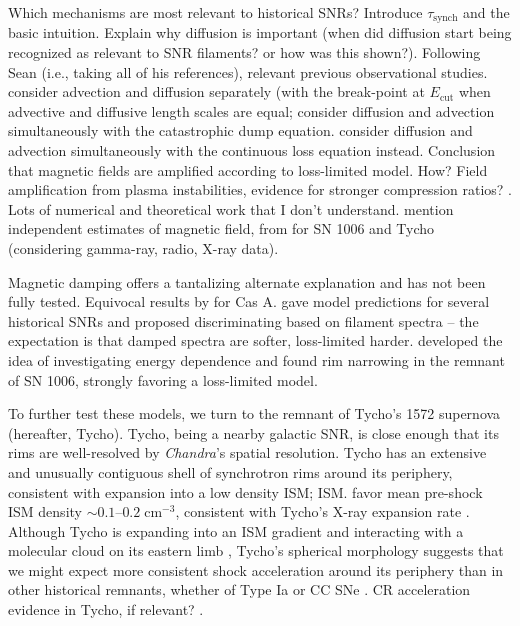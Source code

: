 \documentclass[iop, apj, numberedappendix, twocolappendix]{emulateapj}
\newcommand*{\mt}{\mathrm}
\newcommand*{\unit}[1]{\;\mt{#1}}  %
\newcommand*{\abt}{\mathord{\sim}} %
\newcommand*{\tsynch}{\tau_{\mt{synch}}}
\newcommand*{\Ecut}{E_{\mt{cut}}}
\begin{document}
Which mechanisms are most relevant to historical SNRs?
Introduce $\tsynch$ and the basic intuition. Explain why diffusion is important
(when did diffusion start being recognized as relevant to SNR filaments? or how was
this shown?).
Following Sean (i.e., taking all of his references), relevant previous
observational studies.
\citet{bamba2003, vink2003, yamazaki2004, ballet2006} consider advection and
diffusion separately (with the break-point at $\Ecut$ when advective and
diffusive length scales are equal;
\citet{parizot2006, araya2010} consider diffusion and advection simultaneously
with the catastrophic dump equation.
\citet{berezhko2003, berezhko2004, cassam-chenai2007, morlino2010, rettig2012}
consider diffusion and advection simultaneously with the continuous loss
equation instead.
Conclusion that magnetic fields are amplified according to loss-limited model.  How?  Field
amplification from plasma instabilities, evidence for stronger compression ratios?
\citep{blondin2001}.  Lots of numerical and theoretical work that I don't
understand.
\citet{rettig2012} mention independent estimates of magnetic field, from
\citet{acero2010, acciari2011} for SN 1006 and Tycho (considering gamma-ray,
radio, X-ray data).

Magnetic damping offers a tantalizing alternate explanation and has not
been fully tested.  Equivocal results by \citet{araya2010} for Cas A.
\citet{rettig2012} gave model predictions for several historical SNRs and
proposed discriminating based on filament spectra -- the
expectation is that damped spectra are softer, loss-limited harder.
\citet{ressler2014} developed the idea of investigating energy dependence and
found rim narrowing in the remnant of SN 1006, strongly favoring a loss-limited
model.

To further test these models, we turn to the remnant of Tycho's 1572 supernova
(hereafter, Tycho).  Tycho, being a nearby galactic SNR, is close enough that
its rims are well-resolved by \textit{Chandra}'s spatial resolution.  Tycho has
an extensive and unusually contiguous shell of synchrotron rims around its
periphery, consistent with expansion into a low density ISM; ISM.
\citet{williams2013} favor mean pre-shock ISM density $\abt 0.1$--$0.2
\unit{cm^{-3}}$, consistent with Tycho's X-ray expansion rate
\citep{katsuda2010}.  Although Tycho is expanding into an ISM gradient
\citep{williams2013} and interacting with a molecular cloud on its eastern limb
\citep{reynoso1999}, Tycho's spherical morphology suggests that we might expect
more consistent shock acceleration around its periphery than in other
historical remnants, whether of Type Ia or CC SNe .
CR acceleration evidence in Tycho, if relevant? \citet{eriksen2011,
acciari2011}.
\end{document}
